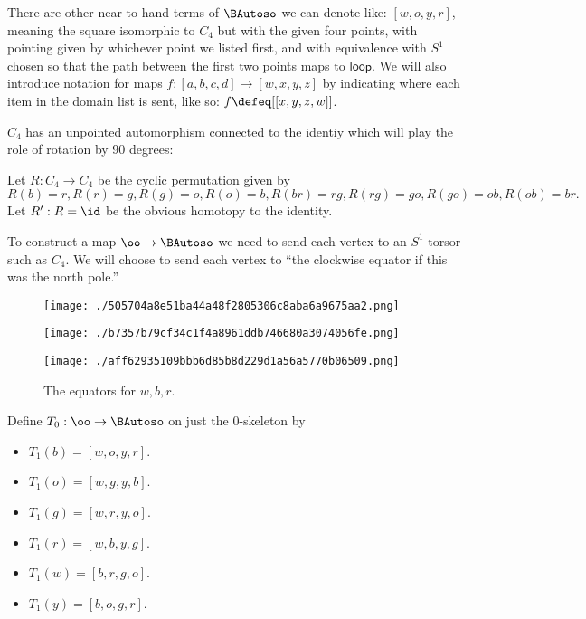 There are other near-to-hand terms of \(\BAutoso\) we can denote like:
\([w, o, y, r]\), meaning the square isomorphic to \(C_4\) but with the
given four points, with pointing given by whichever point we listed
first, and with equivalence with \(S^1\) chosen so that the path between
the first two points maps to \(\mathsf{loop}\). We will also introduce
notation for maps \(f:[a, b, c, d]\to [w, x, y, z]\) by indicating where
each item in the domain list is sent, like so:
\(f\defeq[[x, y, z, w]]\).

\(C_4\) has an unpointed automorphism connected to the identiy which
will play the role of rotation by 90 degrees:

\begin{mydef}
Let \( R:C_4\to C_4 \) be the cyclic permutation given by \( R(b)=r, R(r)=g, R(g)=o, R(o)=b, R(br)=rg, R(rg)=go, R(go)=ob, R(ob)=br. \) Let \( R':R=\id \) be the obvious homotopy to the identity.
\end{mydef}

To construct a map \(\oo\to\BAutoso\) we need to send each vertex to an
\(S^1\)-torsor such as \(C_4\). We will choose to send each vertex to
``the clockwise equator if this was the north pole.''

\begin{figure}
\centering
\begin{minipage}[t]{0.225\linewidth}
\centering
\end{minipage}
\hfill
\begin{minipage}[t]{0.225\linewidth}
\texttt{[image: ./505704a8e51ba44a48f2805306c8aba6a9675aa2.png]}
\end{minipage}
\hfill
\begin{minipage}[t]{0.225\linewidth}
\texttt{[image: ./b7357b79cf34c1f4a8961ddb746680a3074056fe.png]}
\end{minipage}
\hfill
\begin{minipage}[t]{0.225\linewidth}
\texttt{[image: ./aff62935109bbb6d85b8d229d1a56a5770b06509.png]}
\end{minipage}
\caption{The equators for \(w, b, r\).}
\end{figure}

\begin{mydef}
Define \( T_0:\oo\to\BAutoso \) on just the 0-skeleton by
\begin{itemize}
\item \( T_1(b)=[w, o, y, r] \).
\item \( T_1(o)=[w, g, y, b] \).
\item \( T_1(g)=[w, r, y, o] \).
\item \( T_1(r)=[w, b, y, g] \).
\item \( T_1(w)=[b, r, g, o] \).
\item \( T_1(y)=[b, o, g, r] \).
\end{itemize}
\end{mydef}

